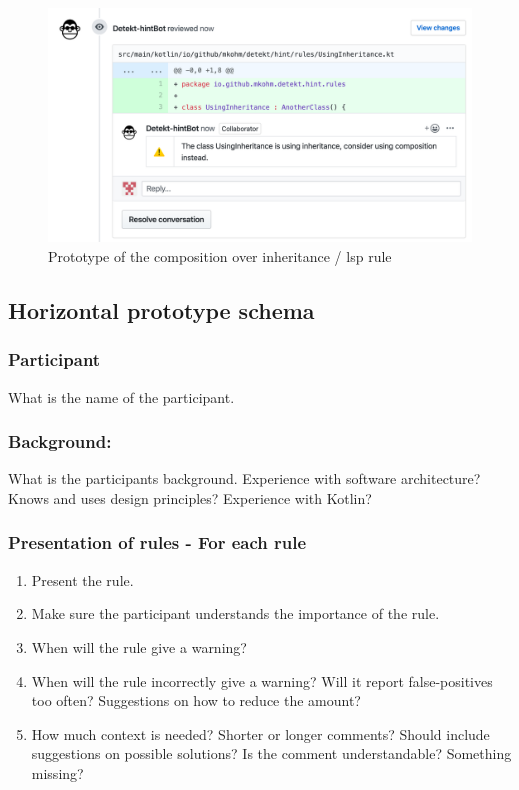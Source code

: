 \begin{figure}[h!]
    \centering
    \includegraphics[width=\textwidth]{../demo.png}
    \caption{Prototype of the composition over inheritance / \gls{lsp} rule}
    \label{fig:liskov}
\end{figure}

\clearpage

\subsection{Horizontal prototype schema}
\subsubsection*{Participant} What is the name of the participant.
\subsubsection*{Background:} What is the participants background. Experience with software architecture? Knows and uses design principles? Experience with Kotlin?
\subsubsection*{Presentation of rules - For each rule}
\begin{enumerate}
    \item Present the rule. 
    \item Make sure the participant understands the importance of the rule.
    \item When will the rule give a warning?
    \item When will the rule incorrectly give a warning? Will it report false-positives too often? Suggestions on how to reduce the amount?
    \item How much context is needed? Shorter or longer comments? Should include suggestions on possible solutions? Is the comment understandable? Something missing?
\end{enumerate}

